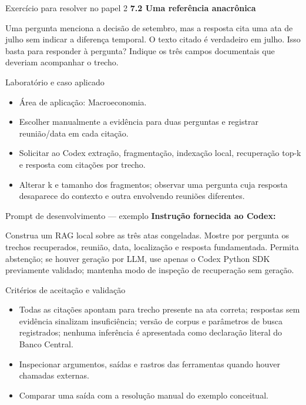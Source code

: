 \documentclass[10pt,aspectratio=169]{beamer}
\begin{document}
\begin{frame}[t]{Exercício para resolver no papel 2}
\small
\small\textbf{7.2 Uma referência anacrônica}\par\vspace{4mm}Uma pergunta menciona a decisão de setembro, mas a resposta cita uma ata de julho sem indicar a diferença temporal. O texto citado é verdadeiro em julho. Isso basta para responder à pergunta? Indique os três campos documentais que deveriam acompanhar o trecho.
\end{frame}

\begin{frame}[t]{Laboratório e caso aplicado}
\small
\begin{itemize}
\item Área de aplicação: Macroeconomia.
\item Escolher manualmente a evidência para duas perguntas e registrar reunião/data em cada citação.
\item Solicitar ao Codex extração, fragmentação, indexação local, recuperação top-k e resposta com citações por trecho.
\item Alterar k e tamanho dos fragmentos; observar uma pergunta cuja resposta desaparece do contexto e outra envolvendo reuniões diferentes.
\end{itemize}
\end{frame}

\begin{frame}[t]{Prompt de desenvolvimento — exemplo}
\small
\small\textbf{Instrução fornecida ao Codex:}\par\vspace{5mm}Construa um RAG local sobre as três atas congeladas. Mostre por pergunta os trechos recuperados, reunião, data, localização e resposta fundamentada. Permita abstenção; se houver geração por LLM, use apenas o Codex Python SDK previamente validado; mantenha modo de inspeção de recuperação sem geração.
\end{frame}

\begin{frame}[t]{Critérios de aceitação e validação}
\small
\begin{itemize}
\item Todas as citações apontam para trecho presente na ata correta; respostas sem evidência sinalizam insuficiência; versão de corpus e parâmetros de busca registrados; nenhuma inferência é apresentada como declaração literal do Banco Central.
\item Inspecionar argumentos, saídas e rastros das ferramentas quando houver chamadas externas.
\item Comparar uma saída com a resolução manual do exemplo conceitual.
\end{itemize}
\end{frame}
\end{document}
